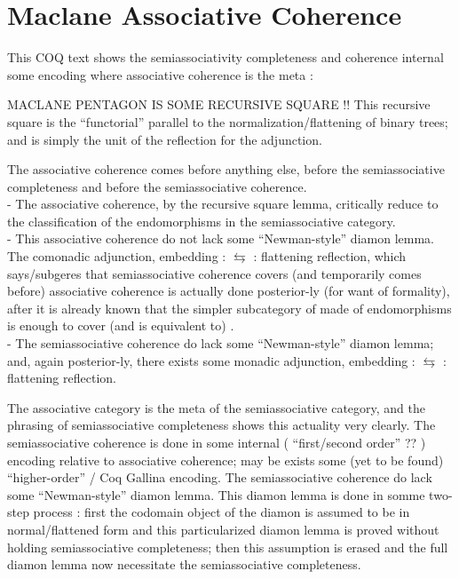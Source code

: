\begin{coqdoccode}
\coqdocemptyline
\end{coqdoccode}
\section{Maclane Associative Coherence}

\begin{coqdoccode}
\coqdocemptyline
\coqdocemptyline
\end{coqdoccode}
This COQ text shows the semiassociativity completeness and coherence internal some encoding where associative coherence is the meta :


    MACLANE PENTAGON IS SOME RECURSIVE SQUARE !! This recursive square  is the ``functorial'' parallel to the normalization/flattening of binary trees; and is simply the unit of the reflection for the adjunction.


    The associative coherence comes before anything else, before the semiassociative completeness and before the semiassociative coherence.
\\ - The associative coherence, by the recursive square lemma, critically reduce to the classification of the endomorphisms in the semiassociative category. 
\\ - This associative coherence do not lack some ``Newman-style'' diamon lemma. The comonadic  adjunction, embedding :  $\leftrightarrows$  : flattening reflection, which says/subgeres that semiassociative coherence covers (and temporarily comes before) associative coherence is actually done posterior-ly (for want of formality), after it is already known that the simpler  subcategory of  made of endomorphisms is enough to cover (and is equivalent to) .
\\ - The semiassociative coherence do lack some ``Newman-style'' diamon lemma; and, again posterior-ly, there exists some monadic adjunction, embedding :  $\leftrightarrows$  : flattening reflection.


    The associative category is the meta of the semiassociative category, and the phrasing of semiassociative completeness  shows this actuality very clearly. The semiassociative coherence is done in some internal ( ``first/second order'' ?? ) encoding relative to associative coherence; may be exists some (yet to be found) ``higher-order'' / Coq Gallina encoding. The semiassociative coherence do lack some ``Newman-style'' diamon lemma. This diamon lemma is done in somme two-step process : first the codomain object of the diamon is assumed to be in normal/flattened form and this particularized diamon lemma  is proved without holding semiassociative completeness; then this assumption is erased and the full diamon lemma  now necessitate the semiassociative completeness.


